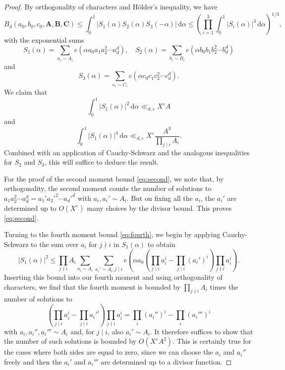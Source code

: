 \documentclass[a4paper,11pt,twoside,reqno]{amsart}
\def\Ab{\mathbf{A}}
\def\Bb{\mathbf{B}}
\def\Cb{\mathbf{C}}
\newcommand\ddd{\,\mathrm{d}}
\renewcommand{\le}{\leqslant}
\theoremstyle{plain}
\theoremstyle{remark}
\numberwithin{prop}{section}
\numberwithin{equation}{section}
\begin{document}
\begin{proof}
    By orthogonality of characters and Hölder's inequality, we have
    \[
    B_d(a_0,b_0,c_0,\Ab,\Bb,\Cb) \le \int_0^1 |S_1(\alpha)S_2(\alpha)S_3(-\alpha)| \ddd\alpha \le \left(\prod_{i=1}^3 \int_0^1 |S_i(\alpha)|^3 \ddd\alpha\right)^{1/3},
    \]
    with the exponential sums
    \[S_1(\alpha)=\sum_{a_i \sim A_i} e(\alpha a_0a_1a_2^2\cdots a_d^d), \quad S_2(\alpha)=\sum_{b_i \sim B_i} e(\alpha b_0b_1b_2^2\cdots b_d^d)\]
    and
    \[S_3(\alpha)=\sum_{c_i \sim C_i} e(\alpha c_0c_1c_2^2\cdots c_d^d).\]
    We claim that 
    \begin{equation}\label{eq:second}
        \int_0^1 |S_1(\alpha)|^2 \ddd\alpha \ll_{d,\varepsilon} X^{\varepsilon} A
    \end{equation}
    and 
    \begin{equation}\label{eq:fourth}
        \int_0^1 |S_1(\alpha)|^4 \ddd\alpha \ll_{d,\varepsilon} X^{\varepsilon} \frac{A^3}{\prod_{j \mid i} A_i}.
    \end{equation}
    Combined with an application of Cauchy-Schwarz and the analogous inequalities for $S_2$ and $S_3$, this will suffice to deduce the result.

    For the proof of the second moment bound \eqref{eq:second}, we note that, by orthogonality, the second moment counts the number of solutions to $a_1a_2^2\cdots a_d^d=a_1'a_2'^2\cdots a_d'^d$     with $a_i,a_i' \sim A_i$. But on fixing all the $a_i$, the $a_i'$ are determined up to $O(X^{\varepsilon})$ many choices by the divisor bound. This proves \eqref{eq:second}.
    
    Turning to the fourth moment bound \eqref{eq:fourth}, we begin by applying Cauchy-Schwarz to the sum over $a_i$ for $j \nmid i$ in $S_1(\alpha)$ to obtain
    \[|S_1(\alpha)|^2 \le \prod_{j \nmid i} A_i \sum_{a_i \sim A_i} \sum_{a_i' \sim A_i, j \mid i}  e\left(\alpha a_0 \left(\prod_{j \mid i} a_i^i-\prod_{j \mid i} (a_i')^i\right)\prod_{j \nmid i} a_i^i\right).\]
    Inserting this bound into our fourth moment and using orthogonality of characters, we find that the fourth moment is bounded by $\prod_{j \nmid i} A_i$ times the number of solutions to
    \[
    \left(\prod_{j \mid i} a_i^i- \prod_{j \mid i} a_i'^i\right)\prod_{j \nmid i} a_i^i=\prod_i (a_i'')^i-\prod_i (a_i''')^i
    \]
    with $a_i,a_i'', a_i''' \sim A_i$ and, for $j \mid i$, also $a_i' \sim A_i$.
    It therefore suffices to show that the number of such solutions is bounded by $O(X^{\varepsilon} A^2)$.
    This is certainly true for the cases where both sides are equal to zero, since we can choose the $a_i$ and $a_i''$ freely and then the $a_i'$ and $a_i'''$ are determined up to a divisor function.
    

\end{proof}
\end{document}
